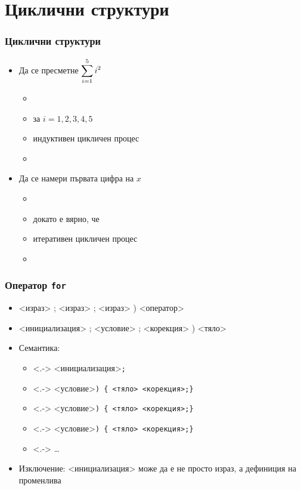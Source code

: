 \documentclass{beamer}
\begin{document}
\section{Циклични структури}

\begin{frame}
  \frametitle{Циклични структури}

  \begin{itemize}[<+->]
  \item Да се пресметне $\displaystyle\sum_{i=1}^5\limits i^2$
    \begin{itemize}
    \item {}
    \item {} за $i = 1, 2, 3, 4, 5$
    \item индуктивен цикличен процес
    \item {}
    \end{itemize}
  \item Да се намери първата цифра на $x$
    \begin{itemize}
    \item {}
    \item {} докато е вярно, че 
    \item итеративен цикличен процес
    \item {}
    \end{itemize}
  \end{itemize}
\end{frame}

\begin{frame}
  \frametitle{Оператор \tt{for}}

  \begin{itemize}[<+->]
  \item {}<израз> \tta; <израз> \tta; <израз> \tta) <оператор>
  \item {}<инициализация> \tta; <условие> \tta; <корекция> \tta) <тяло>
  \item Семантика:
    \begin{itemize}
    \item<.-> <инициализация>\tt;
    \item<.-> <условие>\tt{) \{} <тяло> <корекция>\tt{;\}}
    \item<.-> <условие>\tt{) \{} <тяло> <корекция>\tt{;\}}
    \item<.-> <условие>\tt{) \{} <тяло> <корекция>\tt{;\}}
    \item<.-> \ldots
    \end{itemize}
  \item \alert{Изключение:} <инициализация> може да е не просто израз, а дефиниция на променлива
  \end{itemize}
\end{frame}
\end{document}
